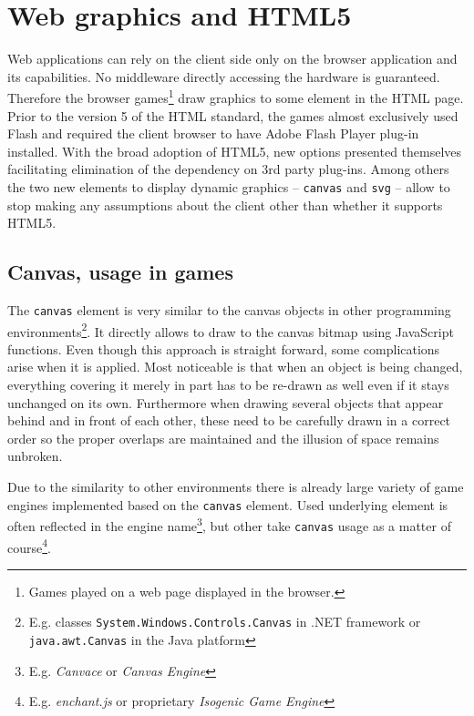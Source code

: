 \documentclass[11pt,oneside, final]{fithesis2}
\begin{document}
\section{Web graphics and HTML5}
Web applications can rely on the client side only on the browser application and its capabilities. No middleware directly accessing the hardware is guaranteed. Therefore the browser games\footnote{Games played on a web page displayed in the browser.} draw graphics to some element in the HTML page. Prior to the version 5 of the HTML standard, the games almost exclusively used Flash and required the client browser to have Adobe Flash Player plug-in installed\cite{flashplayer}. With the broad adoption of HTML5, new options presented themselves facilitating elimination of the dependency on 3rd party plug-ins. Among others the two new elements to display dynamic graphics -- \texttt{canvas} and \texttt{svg} -- allow to stop making any assumptions about the client other than whether it supports HTML5\cite{w3_html5}.

\subsection{Canvas, usage in games}
The \texttt{canvas} element is very similar to the canvas objects in other programming environments\footnote{E.g. classes \texttt{System.Windows.Controls.Canvas} in .NET framework\cite{net_canvas} or \texttt{java.awt.Canvas} in the Java platform\cite{java_canvas}}. It directly allows to draw to the canvas bitmap using JavaScript functions. Even though this approach is straight forward, some complications arise when it is applied. Most noticeable is that when an object is being changed, everything covering it merely in part has to be re-drawn as well even if it stays unchanged on its own. Furthermore when drawing several objects that appear behind and in front of each other, these need to be carefully drawn in a correct order so the proper overlaps are maintained and the illusion of space remains unbroken.

Due to the similarity to other environments there is already large variety of game engines implemented based on the \texttt{canvas} element. Used underlying element is often reflected in the engine name\footnote{E.g. \emph{Canvace}\cite{canvace} or \emph{Canvas Engine}\cite{canvasengine}}, but other take \texttt{canvas} usage as a matter of course\footnote{E.g. \emph{enchant.js}\cite{enchantjs} or proprietary \emph{Isogenic Game Engine}\cite{isogenic}}.
\end{document}
